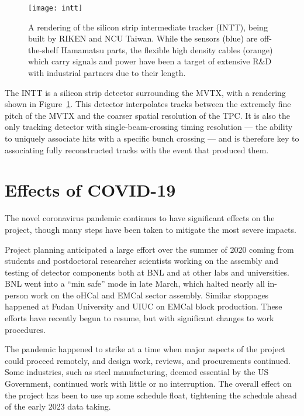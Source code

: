 \begin{figure}[hbt!]
  \centering
  \texttt{[image: intt]}
  \caption{A rendering of the silicon strip intermediate tracker
    (INTT), being built by RIKEN and NCU Taiwan.  While the sensors
    (blue) are off-the-shelf Hamamatsu parts, the flexible high
    density cables (orange) which carry signals and power have been a
    target of extensive R\&D with industrial partners due to their
    length.}
  \label{fig:intt}
\end{figure}

The INTT is a silicon strip detector surrounding the MVTX, with a rendering shown in
Figure~\ref{fig:intt}.  This detector interpolates tracks between the
extremely fine pitch of the MVTX and the coarser spatial
resolution of the TPC.  It is also the only tracking detector with
single-beam-crossing timing resolution --- the ability to uniquely associate
hits with a specific bunch crossing --- and is therefore key to
associating fully reconstructed tracks with the event that produced
them.

\section{Effects of COVID-19}
\label{sec:covid}

The novel coronavirus pandemic continues to have significant effects on the
project, though many steps have been taken to mitigate the most severe
impacts.

Project planning anticipated a large effort over the summer of 2020
coming from students and postdoctoral researcher scientists working on the assembly and testing
of detector components both at BNL and at other labs and universities.
BNL went into a ``min safe'' mode in late March, which halted nearly
all in-person work on the oHCal and EMCal sector assembly.  Similar
stoppages happened at Fudan University and UIUC on EMCal block
production.  These efforts have recently begun to resume, but with
significant changes to work procedures.

The pandemic happened to strike at a time when major aspects of the
project could proceed remotely, and design work, reviews, and procurements continued.  
Some industries, such
as steel manufacturing, deemed essential by the US Government,
continued work with little or no interruption.  
The overall effect on the project has been to use up some schedule float,
tightening the schedule ahead of the early 2023 data taking.

